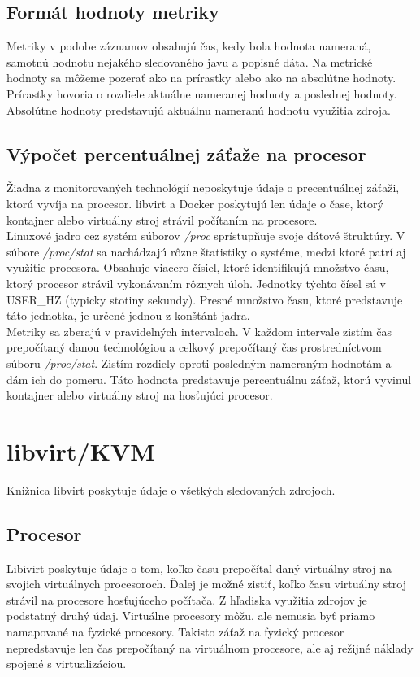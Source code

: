 \documentclass[printed,11pt,twoside,color,cover,table]{fithesis3}
\begin{document}
\subsection{Formát hodnoty metriky}
Metriky v podobe záznamov obsahujú čas, kedy bola hodnota nameraná, samotnú hodnotu nejakého sledovaného javu a popisné dáta. Na metrické
hodnoty sa môžeme pozerať ako na prírastky alebo ako na absolútne hodnoty. Prírastky hovoria o rozdiele aktuálne nameranej hodnoty 
a poslednej hodnoty. Absolútne hodnoty predstavujú aktuálnu nameranú hodnotu využitia zdroja. 

\subsection{Výpočet percentuálnej záťaže na procesor}
Žiadna z monitorovaných technológií neposkytuje údaje o precentuálnej záťaži, ktorú vyvíja na procesor. libvirt a Docker poskytujú len údaje o čase, ktorý kontajner alebo virtuálny stroj strávil
počítaním na procesore. 
\\Linuxové jadro cez systém súborov \textit{/proc} sprístupňuje svoje dátové štruktúry. V súbore \textit{/proc/stat} sa nachádzajú rôzne štatistiky o systéme, medzi ktoré patrí aj 
využitie procesora. Obsahuje viacero čísiel, ktoré identifikujú množstvo času, ktorý procesor strávil vykonávaním rôznych úloh. Jednotky týchto čísel sú v USER\_HZ (typicky stotiny sekundy).\cite{proc-stat}
Presné množstvo času, ktoré predstavuje táto jednotka, je určené jednou z konštánt jadra.
\\Metriky sa zberajú v pravidelných intervaloch. V každom intervale zistím čas prepočítaný danou technológiou a celkový prepočítaný čas prostredníctvom súboru \textit{/proc/stat}. Zistím rozdiely oproti posledným nameraným hodnotám a dám ich do pomeru.
Táto hodnota predstavuje percentuálnu záťaž, ktorú vyvinul kontajner alebo virtuálny stroj na hosťujúci procesor.

\section{libvirt/KVM}
Knižnica libvirt poskytuje údaje o všetkých sledovaných zdrojoch.

\subsection{Procesor}
Libivirt poskytuje údaje o tom, koľko času prepočítal daný virtuálny stroj na svojich virtuálnych procesoroch. Ďalej je možné zistiť, koľko času virtuálny stroj strávil na procesore hosťujúceho počítača. 
Z hľadiska využitia zdrojov je podstatný druhý údaj. Virtuálne procesory môžu, ale nemusia byť priamo namapované na fyzické procesory. Takisto záťaž na fyzický procesor nepredstavuje len čas prepočítaný
na virtuálnom procesore, ale aj režijné náklady spojené s virtualizáciou.
\end{document}
